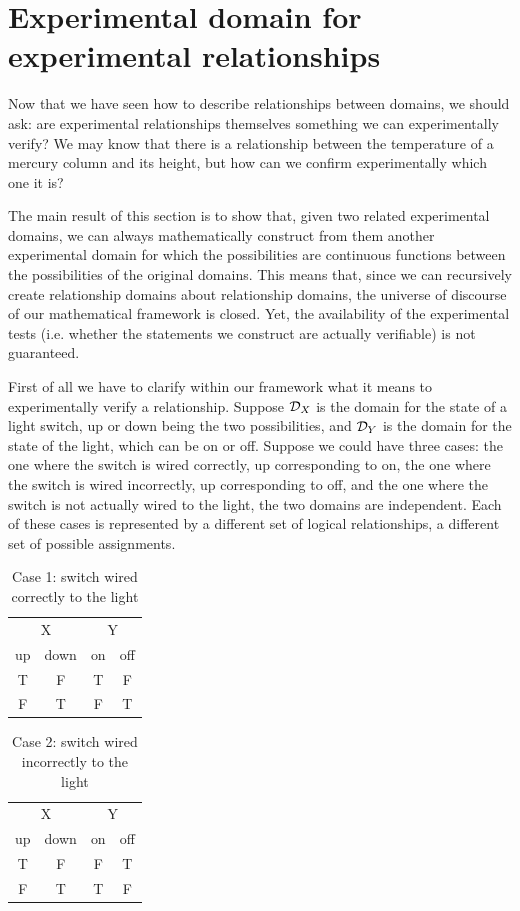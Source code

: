 \section{Experimental domain for experimental relationships}

Now that we have seen how to describe relationships between domains, we should ask: are experimental relationships themselves something we can experimentally verify? We may know that there is a relationship between the temperature of a mercury column and its height, but how can we confirm experimentally which one it is?

The main result of this section is to show that, given two related experimental domains, we can always mathematically construct from them another experimental domain for which the possibilities are continuous functions between the possibilities of the original domains. This means that, since we can recursively create relationship domains about relationship domains, the universe of discourse of our mathematical framework is closed. Yet, the availability of the experimental tests (i.e. whether the statements we construct are actually verifiable) is not guaranteed.

First of all we have to clarify within our framework what it means to experimentally verify a relationship. Suppose $\mathcal{D}_X$ is the domain for the state of a light switch, up or down being the two possibilities, and $\mathcal{D}_Y$ is the domain for the state of the light, which can be on or off. Suppose we could have three cases: the one where the switch is wired correctly, up corresponding to on, the one where the switch is wired incorrectly, up corresponding to off, and the one where the switch is not actually wired to the light, the two domains are independent. Each of these cases is represented by a different set of logical relationships, a different set of possible assignments.

\begin{table}[h]
	\centering
	\begin{tabular}{c|c|c|c}
		\multicolumn{2}{c|}{X} & \multicolumn{2}{c}{Y} \\
		up & down & on & off \\
		\hline
		T & F & T & F \\
		F & T & F & T \\
	\end{tabular}
	\caption{Case 1: switch wired correctly to the light}
\end{table}

\begin{table}[h]
	\centering
	\begin{tabular}{c|c|c|c}
		\multicolumn{2}{c|}{X} & \multicolumn{2}{c}{Y} \\
		up & down & on & off \\
		\hline
		T & F & F & T \\
		F & T & T & F \\
	\end{tabular}
	\caption{Case 2: switch wired incorrectly to the light}
\end{table}

